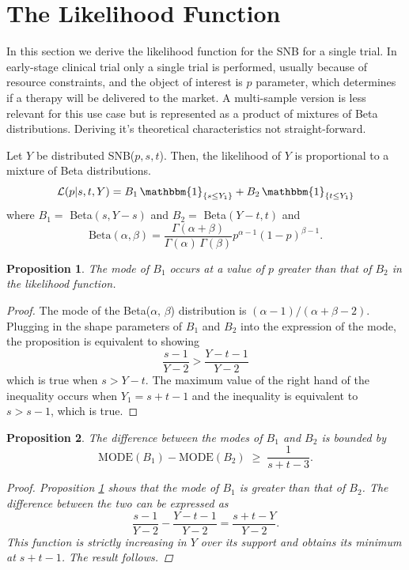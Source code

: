 \documentclass[sii]{ipart}
\newtheorem{prop}{Proposition}
\begin{document}
\section{The Likelihood Function} \label{sect:likelihood}

In this section we derive the likelihood function for the SNB for a single trial. In early-stage clinical trial only a single trial is performed, usually because of resource constraints, and the object of interest is $p$ parameter, which determines if a therapy will be delivered to the market. A multi-sample version is less relevant for this use case but is represented as a product of mixtures of Beta distributions. Deriving it's theoretical characteristics not straight-forward. 

Let $Y$ be distributed SNB($p, s, t$). Then, the likelihood of $Y$ is proportional to a mixture of Beta distributions.
\begin{equation*} \label{eqn:likelihood}
\mathcal{L} (p | s, t, Y) = B_1 \, \mathbbm{1}_{\{s \leq Y_1\}} + B_2 \, \mathbbm{1}_{\{t \leq Y_1 \}}
\end{equation*}
where $B_1 =$ Beta$\left(s, Y - s\right)$ and $B_2 =$ Beta$\left(Y - t, t\right)$ and
\begin{equation*}
\text{Beta}\left( \alpha, \beta \right) = \frac{\Gamma(\alpha+\beta)}{\Gamma(\alpha)\, \Gamma(\beta)} 
p^{\alpha-1} (1-p)^{\beta-1}.
\end{equation*}

\begin{prop} \label{mode_order}
The mode of $B_1$ occurs at a value of $p$ greater than that of $B_2$ in the likelihood function. 
\end{prop}
\begin{proof}
The mode of the Beta($\alpha,\, \beta$) distribution is $(\alpha-1) / (\alpha+\beta-2)$. Plugging in the shape parameters of $B_1$ and $B_2$ into the expression of the mode, the proposition is equivalent to showing
\begin{equation*}
\frac{s-1}{Y - 2} > \frac{Y - t- 1}{Y -2 }
\end{equation*}
which is true when $s > Y - t$. The maximum value of the right hand of the inequality occurs when $Y_1 = s+t-1$ and the inequality is equivalent to $s > s-1$, which is true.
\end{proof}
\begin{prop}
The difference between the modes of $B_1$ and $B_2$ is bounded by
\begin{equation*}
\textrm{MODE}(B_1) - \textrm{MODE}(B_2) 
\; \geq \; \frac{1}{s+t-3}.
\end{equation*}
\begin{proof}
Proposition \ref{mode_order} shows that the mode of $B_1$ is greater than that of $B_2$. The difference
between the two can be expressed as
\begin{equation*}
\frac{s-1}{Y-2} - \frac{Y-t-1}{Y-2} = \frac{s+t-Y}{Y-2}.
\end{equation*}
This function is strictly increasing in $Y$ over its support and obtains its minimum at $s+t-1$. The result follows.
\end{proof}
\end{prop}
\end{document}
